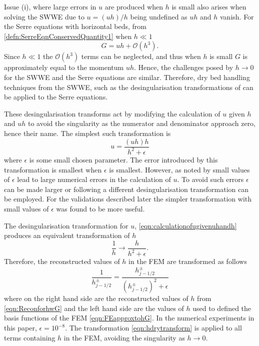 \documentclass[times]{elsarticle}
\begin{document}
Issue (i), where large errors in $u$ are produced when $h$ is small also arises when solving the SWWE due to $u = (uh)/h $ being undefined as $u h $ and $h$ vanish. For the Serre equations with horizontal beds, from \eqref{defn:SerreEqnConservedQuantity1} when $h \ll 1$
\begin{equation*}
G = uh + \mathcal{O}\left(h^3\right).
\end{equation*}
Since $h \ll 1$ the $\mathcal{O}\left(h^3\right)$ terms can be neglected, and thus when $h$ is small $G$ is approximately equal to the momentum $uh$. Hence, the challenges posed by $h \rightarrow 0$ for the SWWE and the Serre equations are similar. Therefore, dry bed handling techniques from the SWWE, such as the desingularisation transformations of \citet{Kurganov-Petrova-2007-707} can be applied to the Serre equations. 

These desingularisation transforms act by modifying the calculation of $u$ given $h$ and $uh$ to avoid the singularity as the numerator and denominator approach zero, hence their name. The simplest such transformation is
\begin{equation}
u = \frac{(uh) h}{h^2 + \epsilon}
\label{eqn:calculationofugivenuhandh}
\end{equation}
where $\epsilon$ is some small chosen parameter. The error introduced by this transformation is smallest when $\epsilon$ is smallest. However, as noted by \citet{Kurganov-Petrova-2007-707} small values of $\epsilon$ lead to large numerical errors in the calculation of $u$. To avoid such errors $\epsilon$ can be made larger or following \citet{Kurganov-Petrova-2007-707} a different desingularisation transformation can be employed. For the validations described later the simpler transformation with small values of $\epsilon$ was found to be more useful.

The desingularisation transformation for $u$, \eqref{eqn:calculationofugivenuhandh} produces an equivalent transformation of $h$
\begin{equation}
\label{eqn:hsimpletransform}
\frac{1}{h} \rightarrow  \frac{h}{h^2 + \epsilon}.
\end{equation}
Therefore, the reconstructed values of $h$ in the FEM are transformed as follows
\begin{equation}
\label{eqn:hdrytransform}
\frac{1}{h^\pm_{j-1/2}}  = \frac{h^\pm_{j-1/2}}{ \left(h^\pm_{j-1/2} \right)^2  + \epsilon}
\end{equation} 
where on the right hand side are the reconstructed values of $h$ from \eqref{eqn:ReconforhwG} and the left hand side are the values of $h$ used to defined the basis functions of the FEM \eqref{eqn:FEapproxtohG}. In the numerical experiments in this paper, $\epsilon = 10^{-8}$. The transformation \eqref{eqn:hdrytransform} is applied to all terms containing $h$ in the FEM, avoiding the singularity as $h \rightarrow 0$.
\end{document}
